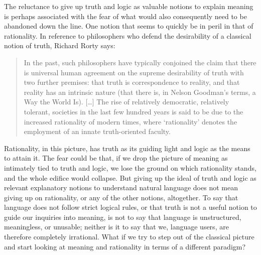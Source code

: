 \documentclass[a4paper]{article}
\begin{document}
The reluctance to give up truth and logic as valuable notions to explain meaning is perhaps associated with the fear of what would also consequently need to be abandoned down the line.
One notion that seems to quickly be in peril in that of rationality.
In reference to philosophers who defend the desirability of a classical notion of truth, Richard Rorty says:
\begin{quote}
In the past, such philosophers have typically conjoined the claim that there is universal human agreement on the supreme desirability of truth with two further premises: that truth is correspondence to reality, and that reality has an intrinsic nature (that there is, in Nelson Goodman's terms, a Way the World Is).
[\ldots]
The rise of relatively democratic, relatively tolerant, societies in the last few hundred years is said to be due to the increased rationality of modern times, where `rationality' denotes the employment of an innate truth-oriented faculty.%
~\parencite*[1]{rorty_response_2000-1}
\end{quote}
Rationality, in this picture, has truth as its guiding light and logic as the means to attain it.
The fear could be that, if we drop the picture of meaning as intimately tied to truth and logic, we lose the ground on which rationality stands, and the whole edifice would collapse.
But giving up the ideal of truth and logic as relevant explanatory notions to understand natural language does not mean giving up on rationality, or any of the other notions, altogether.
To say that language does not follow strict logical rules, or that truth is not a useful notion to guide our inquiries into meaning, is not to say that language is unstructured, meaningless, or unusable; neither is it to say that we, language users, are therefore completely irrational.
What if we try to step out of the classical picture and start looking at meaning and rationality in terms of a different paradigm?
\end{document}
